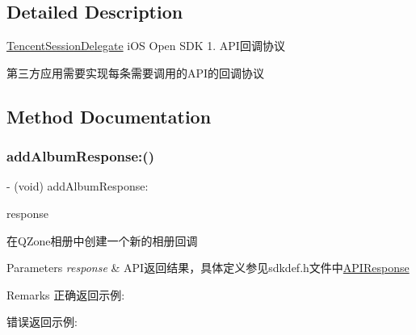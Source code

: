 \subsection{Detailed Description}
\mbox{\hyperlink{protocol_tencent_session_delegate-p}{Tencent\+Session\+Delegate}} i\+OS Open S\+DK 1. A\+P\+I回调协议 

第三方应用需要实现每条需要调用的\+A\+P\+I的回调协议 

\subsection{Method Documentation}
\mbox{\label{protocol_tencent_session_delegate-p_a065feaea11a1a1ec423a85859b36a0c5}} 
\subsubsection{\texorpdfstring{add\+Album\+Response\+:()}{addAlbumResponse:()}\hspace{0.1cm}{\footnotesize\ttfamily [1/2]}}
{\footnotesize\ttfamily -\/ (void) add\+Album\+Response\+: \begin{DoxyParamCaption}\item[{(\mbox{\hyperlink{interface_a_p_i_response}{A\+P\+I\+Response}} $\ast$)}]{response }\end{DoxyParamCaption}\hspace{0.3cm}{\ttfamily [optional]}}

在\+Q\+Zone相册中创建一个新的相册回调 
\begin{DoxyParams}{Parameters}
{\em response} & A\+P\+I返回结果，具体定义参见sdkdef.\+h文件中\mbox{\hyperlink{interface_a_p_i_response}{A\+P\+I\+Response}} \\
\hline
\end{DoxyParams}
\begin{DoxyRemark}{Remarks}
正确返回示例\+: 
\begin{DoxyCodeInclude}
\end{DoxyCodeInclude}
 错误返回示例\+: 
\begin{DoxyCodeInclude}
\end{DoxyCodeInclude}

\end{DoxyRemark}
\mbox{\label{protocol_tencent_session_delegate-p_a065feaea11a1a1ec423a85859b36a0c5}} 
